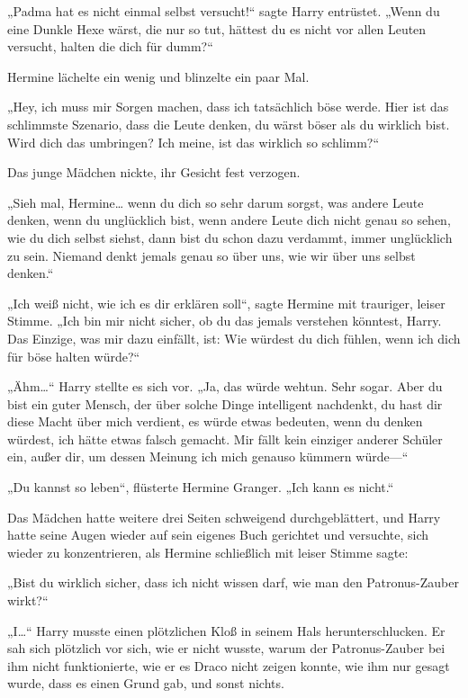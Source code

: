 {„Padma hat es nicht einmal selbst versucht!“ sagte Harry entrüstet. „Wenn du eine Dunkle Hexe wärst, die nur so tut, hättest du es nicht vor allen Leuten versucht, halten die dich für dumm?“

Hermine lächelte ein wenig und blinzelte ein paar Mal.

„Hey, ich muss mir Sorgen machen, dass ich tatsächlich böse werde. Hier ist das schlimmste Szenario, dass die Leute denken, du wärst böser als du wirklich bist. Wird dich das umbringen? Ich meine, ist das wirklich so schlimm?“

Das junge Mädchen nickte, ihr Gesicht fest verzogen.

„Sieh mal, Hermine… wenn du dich so sehr darum sorgst, was andere Leute denken, wenn du unglücklich bist, wenn andere Leute dich nicht genau so sehen, wie du dich selbst siehst, dann bist du schon dazu verdammt, immer unglücklich zu sein. Niemand denkt jemals genau so über uns, wie wir über uns selbst denken.“

„Ich weiß nicht, wie ich es dir erklären soll“, sagte Hermine mit trauriger, leiser Stimme. „Ich bin mir nicht sicher, ob du das jemals verstehen könntest, Harry. Das Einzige, was mir dazu einfällt, ist: Wie würdest du dich fühlen, wenn ich dich für böse halten würde?“

„Ähm…“ Harry stellte es sich vor. „Ja, das würde wehtun. Sehr sogar. Aber du bist ein guter Mensch, der über solche Dinge intelligent nachdenkt, du hast dir diese Macht über mich verdient, es würde etwas bedeuten, wenn du denken würdest, ich hätte etwas falsch gemacht. Mir fällt kein einziger anderer Schüler ein, außer dir, um dessen Meinung ich mich genauso kümmern würde—“

„Du kannst so leben“, flüsterte Hermine Granger. „Ich kann es nicht.“

Das Mädchen hatte weitere drei Seiten schweigend durchgeblättert, und Harry hatte seine Augen wieder auf sein eigenes Buch gerichtet und versuchte, sich wieder zu konzentrieren, als Hermine schließlich mit leiser Stimme sagte:

„Bist du wirklich sicher, dass ich nicht wissen darf, wie man den Patronus-Zauber wirkt?“

„I…“ Harry musste einen plötzlichen Kloß in seinem Hals herunterschlucken. Er sah sich plötzlich vor sich, wie er nicht wusste, warum der Patronus-Zauber bei ihm nicht funktionierte, wie er es Draco nicht zeigen konnte, wie ihm nur gesagt wurde, dass es einen Grund gab, und sonst nichts.

}
